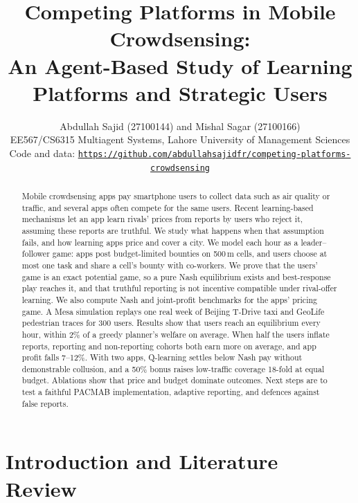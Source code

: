 \documentclass[12pt,draftcls,onecolumn]{IEEEtran}
\begin{document}
\title{Competing Platforms in Mobile Crowdsensing:\\ An Agent-Based Study of Learning Platforms and Strategic Users}

\author{Abdullah Sajid (27100144) and Mishal Sagar (27100166)\\
EE567/CS6315 Multiagent Systems, Lahore University of Management Sciences\\
Code and data: \texttt{\url{https://github.com/abdullahsajidfr/competing-platforms-crowdsensing}}}

\maketitle

\begin{abstract}
Mobile crowdsensing apps pay smartphone users to collect data such as air quality or traffic, and several apps often compete for the same users. Recent learning-based mechanisms let an app learn rivals' prices from reports by users who reject it, assuming these reports are truthful. We study what happens when that assumption fails, and how learning apps price and cover a city. We model each hour as a leader--follower game: apps post budget-limited bounties on 500\,m cells, and users choose at most one task and share a cell's bounty with co-workers. We prove that the users' game is an exact potential game, so a pure Nash equilibrium exists and best-response play reaches it, and that truthful reporting is not incentive compatible under rival-offer learning. We also compute Nash and joint-profit benchmarks for the apps' pricing game. A Mesa simulation replays one real week of Beijing T-Drive taxi and GeoLife pedestrian traces for 300 users. Results show that users reach an equilibrium every hour, within 2\% of a greedy planner's welfare on average. When half the users inflate reports, reporting and non-reporting cohorts both earn more on average, and app profit falls 7--12\%. With two apps, Q-learning settles below Nash pay without demonstrable collusion, and a 50\% bonus raises low-traffic coverage 18-fold at equal budget. Ablations show that price and budget dominate outcomes. Next steps are to test a faithful PACMAB implementation, adaptive reporting, and defences against false reports.
\end{abstract}

\section{Introduction and Literature Review}
\end{document}
